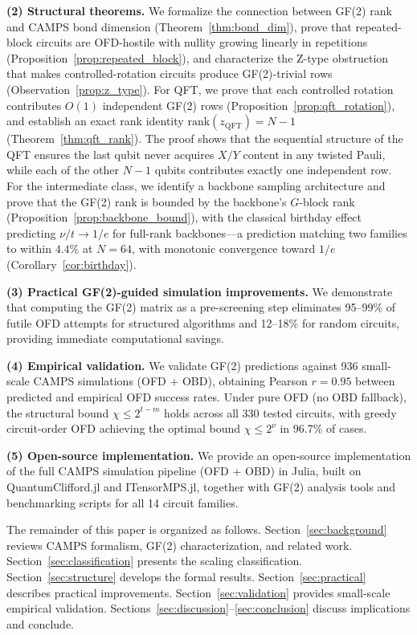 \documentclass[a4paper,twocolumn,11pt]{quantumarticle}
\begin{document}
\textbf{(2) Structural theorems.}
We formalize the connection between GF(2) rank and CAMPS bond dimension (Theorem~\ref{thm:bond_dim}), prove that repeated-block circuits are OFD-hostile with nullity growing linearly in repetitions (Proposition~\ref{prop:repeated_block}), and characterize the Z-type obstruction that makes controlled-rotation circuits produce GF(2)-trivial rows (Observation~\ref{prop:z_type}).
For QFT, we prove that each controlled rotation contributes $O(1)$ independent GF(2) rows (Proposition~\ref{prop:qft_rotation}), and establish an exact rank identity $\mathrm{rank}(z_{\mathrm{QFT}}) = N - 1$ (Theorem~\ref{thm:qft_rank}).
The proof shows that the sequential structure of the QFT ensures the last qubit never acquires $X/Y$ content in any twisted Pauli, while each of the other $N - 1$ qubits contributes exactly one independent row.
For the intermediate class, we identify a backbone sampling architecture and prove that the GF(2) rank is bounded by the backbone's $G$-block rank (Proposition~\ref{prop:backbone_bound}), with the classical birthday effect predicting $\nu/t \to 1/e$ for full-rank backbones---a prediction matching two families to within $4.4\%$ at $N = 64$, with monotonic convergence toward $1/e$ (Corollary~\ref{cor:birthday}).

\textbf{(3) Practical GF(2)-guided simulation improvements.}
We demonstrate that computing the GF(2) matrix as a pre-screening step eliminates 95--99\% of futile OFD attempts for structured algorithms and 12--18\% for random circuits, providing immediate computational savings.

\textbf{(4) Empirical validation.}
We validate GF(2) predictions against 936 small-scale CAMPS simulations (OFD + OBD), obtaining Pearson $r = 0.95$ between predicted and empirical OFD success rates.
Under pure OFD (no OBD fallback), the structural bound $\chi \le 2^{t-m}$ holds across all 330 tested circuits, with greedy circuit-order OFD achieving the optimal bound $\chi \le 2^\nu$ in 96.7\% of cases.

\textbf{(5) Open-source implementation.}
We provide an open-source implementation of the full CAMPS simulation pipeline (OFD + OBD) in Julia, built on QuantumClifford.jl and ITensorMPS.jl, together with GF(2) analysis tools and benchmarking scripts for all 14 circuit families.

The remainder of this paper is organized as follows.
Section~\ref{sec:background} reviews CAMPS formalism, GF(2) characterization, and related work.
Section~\ref{sec:classification} presents the scaling classification.
Section~\ref{sec:structure} develops the formal results.
Section~\ref{sec:practical} describes practical improvements.
Section~\ref{sec:validation} provides small-scale empirical validation.
Sections~\ref{sec:discussion}--\ref{sec:conclusion} discuss implications and conclude.
\end{document}
